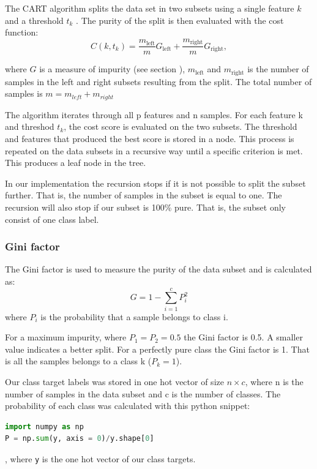 The CART algorithm splits the data set in two subsets using a single feature
$k$ and a threshold $t_k$ \cite{w44}. The purity of the split is then evaluated
with the cost function: 
\begin{equation*}
    \label{eq:cart} 
    C(k, t_k) = \frac{m_{\text{left}} }{m} G_{\text{left}}+
    \frac{m_{\text{right}} }{m} G_{\text{right}}, 
\end{equation*}

where $G$ is a measure of impurity (see section ),
$m_{\text{left}} $ and $m_{\text{right}} $ is the number of samples in the left
and right subsets resulting from the split. The total number of samples is $m =
m_{left} + m_{right}  $ 

The algorithm iterates through all p features and n samples. For each feature k
and threshod $t_k$, the cost score is evaluated on the two subsets. The
threshold and features that produced the best score is stored in a node. This
process is repeated on the data subsets in a recursive way until a specific
criterion is met. This produces a leaf node in the tree. 

In our implementation the recursion stops if it is not possible to split the
subset further. That is, the number of samples in the subset is equal to one.   
The recursion will also stop if our subset is 100\% pure. That is, the subset
only consist of one class label.  

\subsubsection{Gini factor} \label{sec:gini_factor} \hfill

The Gini factor is used to measure the purity of the data subset and is
calculated as:
\begin{equation*}
    G = 1 - \sum_{i=1}^{c} P_i ^2 
\end{equation*}
where $P_i$ is the probability that a sample belongs to class i. 

For a maximum impurity, where $P_1 = P_2 = 0.5$ the Gini factor is 0.5. A
smaller value indicates a better split. For a perfectly pure class the Gini
factor is 1. That is all the samples belongs to a class k ($P_k = 1$).     


Our class target labels was stored in one hot vector of size $n \times c$, 
where n is the number of samples in the data subset and c is the number of
classes. The probability of each class was calculated with this python snippet:
\begin{lstlisting}[language=Python]
import numpy as np
P = np.sum(y, axis = 0)/y.shape[0]
\end{lstlisting},
where \verb|y| is the one hot vector of our class targets. 


